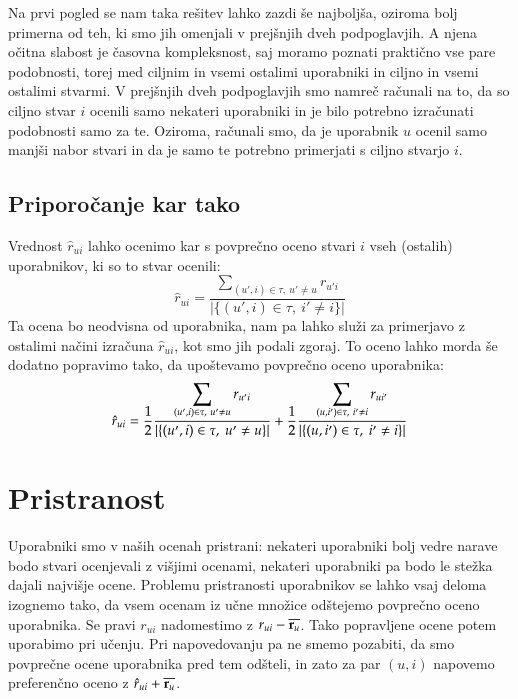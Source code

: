 Na prvi pogled se nam taka rešitev lahko zazdi še najboljša, oziroma bolj primerna od teh, ki smo jih omenjali v prejšnjih dveh podpoglavjih. A njena očitna slabost je časovna kompleksnost, saj moramo poznati praktično vse pare podobnosti, torej med ciljnim in vsemi ostalimi uporabniki in ciljno in vsemi ostalimi stvarmi. V prejšnjih dveh podpoglavjih smo namreč računali na to, da so ciljno stvar $i$ ocenili samo nekateri uporabniki in je bilo potrebno izračunati podobnosti samo za te. Oziroma, računali smo, da je uporabnik $u$ ocenil samo manjši nabor stvari in da je samo te potrebno primerjati s ciljno stvarjo $i$.

\subsection{Priporočanje kar tako}

Vrednost $\hat{r}_{ui}$ lahko ocenimo kar s povprečno oceno stvari $i$ vseh (ostalih) uporabnikov, ki so to stvar ocenili:
%
\begin{equation}
\hat{r}_{ui} = \frac{\displaystyle\sum_{(u',i)\in\tau,\ u'\neq u} r_{u'i}}{|\{(u',i)\in\tau,\ i'\neq i \}|}
\end{equation}
%
Ta ocena bo neodvisna od uporabnika, nam pa lahko služi za primerjavo z ostalimi načini izračuna $\hat{r}_{ui}$, kot smo jih podali zgoraj. To oceno lahko morda še dodatno popravimo tako, da upoštevamo povprečno oceno uporabnika:
%
\begin{equation}
\hat{r}_{ui} = {1\over 2}\frac{\displaystyle\sum_{(u',i)\in\tau,\ u'\neq u} r_{u'i}}{|\{(u',i)\in\tau,\ u'\neq u \}|} + {1\over 2}\frac{\displaystyle\sum_{(u,i')\in\tau,\ i'\neq i} r_{ui'}}{|\{(u,i')\in\tau,\ i'\neq i \}|}
\end{equation}
%

\section{Pristranost}

Uporabniki smo v naših ocenah pristrani: nekateri uporabniki bolj
vedre narave bodo stvari ocenjevali z višjimi ocenami, nekateri
uporabniki pa bodo le stežka dajali najvišje ocene. Problemu
pristranosti uporabnikov se lahko vsaj deloma izognemo tako, da vsem
ocenam iz učne množice odštejemo povprečno oceno uporabnika. Se pravi
$r_{ui}$ nadomestimo z $r_{ui}-\overline{{\bf r}_u}$. Tako
popravljene ocene potem uporabimo pri učenju. Pri napovedovanju pa ne
smemo pozabiti, da smo povprečne ocene uporabnika pred tem odšteli, in
zato za par $(u,i)$ napovemo preferenčno oceno z
$\hat{r}_{ui}+\overline{{\bf r}_u}$.

